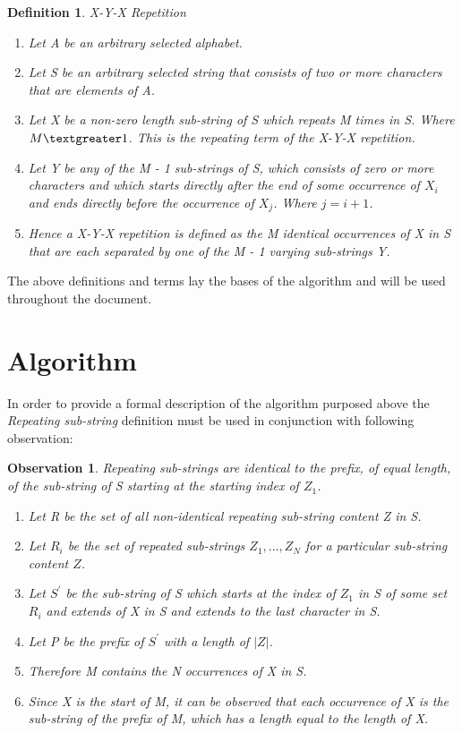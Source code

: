 \documentclass[12pt]{article}
\newtheorem{defn}{Definition}[section]
\newtheorem{obser}{Observation}[section]
\begin{document}
\begin{defn} X-Y-X Repetition
	\begin{enumerate}
		\item Let A be an arbitrary selected alphabet.
		\item Let S be an arbitrary selected string that consists of two or more characters that are elements of A. 
		\item Let X be a non-zero length sub-string of S which repeats M times in S. Where $ M \textgreater 1 $. This is the repeating term of the X-Y-X repetition.		
		\item  Let Y be any of the M - 1 sub-strings of S, which consists of zero or more characters and which starts directly after the end of some occurrence of $X_{i}$ and ends directly before the occurrence of $X_{j}$. Where $j = i + 1$.
		\item Hence a X-Y-X repetition is defined as the M identical occurrences of X in S that are each separated by one of the M - 1 varying sub-strings Y.	
	\end{enumerate}
\end{defn}

The above definitions and terms lay the bases of the algorithm and will be used throughout the document.

\section{Algorithm} 
In order to provide a formal description of the algorithm purposed above the \textit{Repeating sub-string} definition must be used in conjunction with following observation:
\begin{obser} Repeating sub-strings are identical to the prefix, of equal length, of the sub-string of S starting at the starting index of $Z_{1}$. 
	\begin{enumerate}
		
		\item Let R be the set of all non-identical repeating sub-string content Z in S.
		\item Let $R_{i}$ be the set of repeated sub-strings ${Z_{1},...,Z_{N}}$ for a particular sub-string content $Z$.
		\item Let $S^{\prime}$ be the sub-string of S which starts at the index of $Z_{1}$ in S of some set $R_{i}$ and extends of X in S and extends to the last character in S.
		\item Let P be the prefix of $S^{\prime}$ with a length of $|Z|$.
		\item Therefore M contains the N occurrences of X in S.
		\item Since X is the start of M, it can be observed that each occurrence of X is the sub-string of the prefix of M, which has a length equal to the length of X.
	\end{enumerate}
\end{obser}
\end{document}
